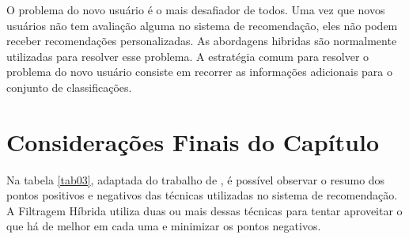 O problema do novo usuário é o mais desafiador de todos. Uma vez que novos usuários não tem 
avaliação alguma no sistema de recomendação, eles não podem receber recomendações personalizadas\cite{burke2002}. As abordagens hibridas são normalmente utilizadas para resolver esse problema. 
A estratégia comum para resolver o problema do novo usuário consiste em recorrer as informações adicionais para o conjunto de classificações\cite{bobadilla2013}.

\section{Considerações Finais do Capítulo}

Na tabela \ref{tab03}, adaptada do trabalho de , é possível observar o resumo dos pontos positivos e negativos das técnicas utilizadas no sistema de recomendação.
A Filtragem Híbrida utiliza duas ou mais dessas técnicas para tentar aproveitar o que há de melhor em cada uma e minimizar os pontos negativos.

